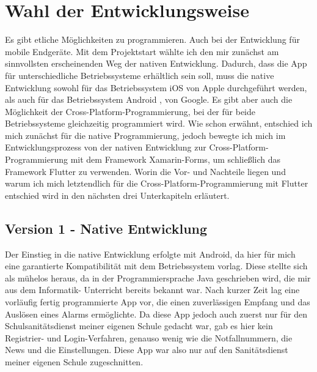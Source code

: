 \section{Wahl der Entwicklungsweise}
   Es gibt etliche Möglichkeiten zu programmieren. Auch bei der 
    Entwicklung für mobile Endgeräte. Mit dem Projektstart wählte ich den mir zunächst am 
    sinnvollsten erscheinenden Weg der nativen Entwicklung.
    Dadurch, dass die App für unterschiedliche Betriebssysteme 
    erhältlich sein soll, muss die native Entwicklung sowohl für das Betriebssystem iOS 
    \cite{iOS} von Apple durchgeführt werden, als auch für das Betriebssystem Android 
    \cite{Android}, von Google.
    Es gibt aber auch die Möglichkeit der Cross-Platform-Programmierung, bei 
    der für beide Betriebssysteme gleichzeitig programmiert wird. 
    Wie schon erwähnt, entschied ich mich zunächst für die native Programmierung, jedoch 
    bewegte ich mich im Entwicklungsprozess von der nativen Entwicklung zur Cross-Platform-
    Programmierung mit dem Framework Xamarin-Forms, um schließlich das Framework Flutter zu 
    verwenden. Worin die Vor- und Nachteile liegen und warum ich mich letztendlich für die 
    Cross-Platform-Programmierung mit Flutter entschied wird in den nächsten drei 
    Unterkapiteln erläutert.

\subsection{Version 1 - Native Entwicklung}
    Der Einstieg in die native Entwicklung erfolgte mit Android, da hier für mich eine 
    garantierte Kompatibilität mit dem Betriebssystem vorlag. Diese stellte sich als mühelos
    heraus, da in der Programmiersprache Java geschrieben wird, die mir aus dem Informatik-
    Unterricht bereits bekannt war.
    Nach kurzer Zeit lag eine vorläufig fertig programmierte App vor, die einen zuverlässigen 
    Empfang und das Auslösen eines Alarms ermöglichte. Da diese App jedoch auch zuerst nur 
    für den Schulsanitätsdienst meiner eigenen Schule gedacht war, gab es hier kein Registrier-
    und Login-Verfahren, genauso wenig wie die Notfallnummern, die News und die Einstellungen.
    Diese App war also nur auf den Sanitätsdienst meiner eigenen Schule zugeschnitten.

